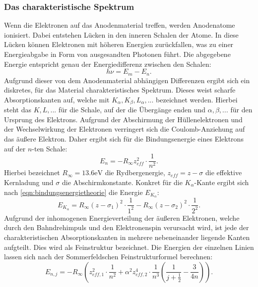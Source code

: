 \subsubsection{Das charakteristische Spektrum}
Wenn die Elektronen auf das Anodenmaterial treffen, werden Anodenatome ionisiert.
Dabei entstehen Lücken in den inneren Schalen der Atome. In diese Lücken können
Elektronen mit höheren Energien zurückfallen, was zu einer Energieabgabe in Form
von ausgesandten Photonen führt. Die abgegebene Energie entspricht genau der
Energiedifferenz zwischen den Schalen:
\begin{equation}
  h \nu = E_m - E_n.
  \label{eqn:absorptionskantentheorie}
\end{equation}
Aufgrund dieser von dem Anodenmaterial abhängigen Differenzen ergibt sich ein
diskretes, für das Material charakteristisches Spektrum. Dieses weist scharfe
Absorptionskanten auf, welche mit $K_{\alpha}, K_{\beta}, L_{\alpha}, ...$
bezeichnet werden. Hierbei steht das $K, L, ...$ für die Schale, auf der die
Übergänge enden und $\alpha, \beta, ...$ für den Ursprung des Elektrons.
Aufgrund der Abschirmung der Hüllenelektronen und der Wechselwirkung der
Elektronen verringert sich die Coulomb-Anziehung auf das äußere Elektron.
Daher ergibt sich für die Bindungsenergie eines Elektrons auf der $n$-ten
Schale:
\begin{equation}
  E_n = -R_{\infty} z_{eff}^2 \cdot \frac{1}{n^2}.
  \label{eqn:bindungsenergietheorie}
\end{equation}
Hierbei bezeichnet $R_{\infty} = 13.6 \si{\electronvolt}$ die Rydbergenergie,
$z_{eff} = z - \sigma$ die effektive Kernladung und $\sigma$ die
Abschirmkonstante. Konkret für die $K_{\alpha}$-Kante ergibt sich nach
\eqref{eqn:bindungsenergietheorie} die Energie $E_{K_\alpha}$:
\begin{equation}
  E_{K_\alpha} = R_{\infty} (z - \sigma_1)^2 \cdot \frac{1}{1^2} - R_{\infty} (z - \sigma_2)^2 \cdot \frac{1}{2^2}.
  \label{eqn:energiekalphatheorie}
\end{equation}
Aufgrund der inhomogenen Energieverteilung der äußeren Elektronen, welche durch
den Bahndrehimpuls und den Elektronenspin verursacht wird, ist jede der
charakteristischen Absorptionskanten in mehrere nebeneinander liegende Kanten
aufgteilt. Dies wird als Feinstruktur bezeichnet. Die Energien der einzelnen
Linien lassen sich nach der Sommerfeldschen Feinstrukturformel berechnen:
\begin{equation}
  E_{n,j} = -R_{\infty} \left( z_{eff,1}^2 \cdot \frac{1}{n^2} + \alpha^2 z_{eff,2}^4 \cdot \frac{1}{n^3} \left(  \frac{1}{j + \frac{1}{2}} - \frac{3}{4n} \right) \right).
  \label{eqn:sommerfeldtheorie}
\end{equation}
